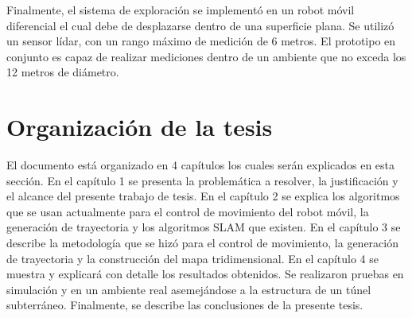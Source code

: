 Finalmente, el sistema de exploración se implementó en un robot móvil diferencial el 
cual debe de desplazarse dentro de una superficie plana. Se utilizó un sensor lídar, con
un rango máximo de medición de 6 metros. El prototipo en conjunto es capaz de realizar 
mediciones dentro de un ambiente que no exceda los 12 metros de diámetro.




\section{Organizaci\'on de la tesis}

El documento está organizado en 4 capítulos los cuales serán explicados en esta
sección. En el capítulo 1 se presenta la problemática a resolver, la justificación y 
el alcance del presente trabajo de tesis. En el capítulo 2 se explica los algoritmos 
que se usan actualmente para el control de movimiento del robot móvil, la generación 
de trayectoria y  los algoritmos SLAM que existen. En el capítulo 3 se describe la 
metodología que se hizó para el control de movimiento, la generación de trayectoria y 
la construcción del mapa tridimensional. En el capítulo 4 se muestra y explicará 
con detalle los resultados obtenidos. Se realizaron pruebas en simulación y en un ambiente 
real asemejándose a la estructura de un túnel subterráneo. Finalmente, se describe las 
conclusiones de la presente tesis.
